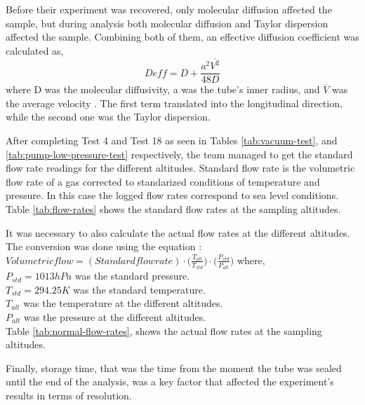 Before their experiment was recovered, only molecular diffusion affected the sample, but during analysis both molecular diffusion and Taylor dispersion affected the sample. Combining both of them, an effective diffusion coefficient was calculated as,
 \begin{equation}
     D{eff} = D + \frac{a^2\overline{V^2}}{48D}
 \end{equation}
where D was the molecular diffusivity, a was the tube's inner radius, and $\overline{V}$ was the average velocity \cite{Membrive}. The first term translated into the longitudinal direction, while the second one was the Taylor dispersion. 

After completing Test 4 and Test 18 as seen in Tables \ref{tab:vacuum-test}, and \ref{tab:pump-low-pressure-test} respectively, the team managed to get the standard flow rate readings for the different altitudes. Standard flow rate is the volumetric flow rate of a gas corrected to standarized conditions of temperature and pressure. In this case the logged flow rates correspond to sea level conditions. Table \ref{tab:flow-rates} shows the standard flow rates at the sampling altitudes.  



It was necessary to also calculate the actual flow rates at the different altitudes. The conversion was done using the equation \cite{flowrateswebsite}:
$ Volumetric flow = (Standard flow rate) \cdot \Big(\frac{T_{alt}}{T_{std}}\Big) \cdot \Big(\frac{P_{std}}{P_{alt}}\Big) $
where, \\
$P_{std}= 1013 hPa$ was the standard pressure. \\
$T_{std}=294.25K$ was the standard temperature.\\
$T_{alt}$ was the temperature at the different altitudes.\\
$P_{alt}$ was the pressure at the different altitudes.\\

Table \ref{tab:normal-flow-rates}, shows the actual flow rates at the sampling altitudes.



Finally, storage time, that was the time from the moment the tube was sealed until the end of the analysis, was a key factor that affected the experiment's results in terms of resolution.

